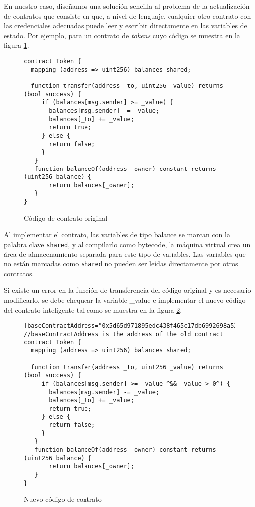 En nuestro caso, diseñamos una solución sencilla al problema de la actualización de contratos que consiste en que, a nivel de lenguaje, cualquier otro contrato con las credenciales adecuadas puede leer y escribir directamente en las variables de estado. Por ejemplo, para un contrato de \textit{tokens} cuyo código se muestra en la figura \ref{figure:nf:oldsc}. \\

	\begin{figure}[!h]
  	\centering
  	\begin{minipage}{0.95\linewidth}
	\begin{lstlisting}[frame=single]
contract Token {
  mapping (address => uint256) balances shared;

  function transfer(address _to, uint256 _value) returns (bool success) {
     if (balances[msg.sender] >= _value) {
       balances[msg.sender] -= _value;
       balances[_to] += _value;
       return true;
     } else {
       return false;
     }
   }
   function balanceOf(address _owner) constant returns (uint256 balance) {
       return balances[_owner];
   }
}
	\end{lstlisting}
  	\end{minipage}
  	\caption{Código de contrato original}
  	\label{figure:nf:oldsc}
	\end{figure}

Al implementar el contrato, las variables de tipo balance se marcan con la palabra clave \texttt{shared}, y al compilarlo como bytecode, la máquina virtual crea un área de almacenamiento separada para este tipo de variables. Las variables que no están marcadas como \texttt{shared} no pueden ser leídas directamente por otros contratos.

Si existe un error en la función de transferencia del código original y es necesario modificarlo, se debe chequear la variable \_value e implementar el nuevo código del contrato inteligente tal como se muestra en la figura \ref{figure:nf:newsc}.

	\begin{figure}[!h]
  	\centering
  	\begin{minipage}{0.95\linewidth}
	\begin{lstlisting}[frame=single]
[baseContractAddress="0x5d65d971895edc438f465c17db6992698a52318d"]
//baseContractAddress is the address of the old contract
contract Token {
  mapping (address => uint256) balances shared;

  function transfer(address _to, uint256 _value) returns (bool success) {
     if (balances[msg.sender] >= _value ^&& _value > 0^) {
       balances[msg.sender] -= _value;
       balances[_to] += _value;
       return true;
     } else {
       return false;
     }
   }
   function balanceOf(address _owner) constant returns (uint256 balance) {
       return balances[_owner];
   }
}
	\end{lstlisting}
  	\end{minipage}
  	\caption{Nuevo código de contrato}
  	\label{figure:nf:newsc}
	\end{figure}

